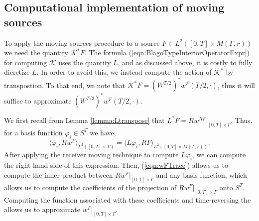 \documentclass[final,leqno]{siamart1116}
\begin{document}
\subsection{Computational implementation of moving sources}
\label{sec:MovingSrcsModification}

To apply the moving sources procedure to a source $F \in L^2([0,T]
\times M(\Gamma,r))$ we need the quantity ${\mathcal{K}}^* F$. The formula
(\ref{eqn:BlagoTypeInteriorOperatorExpr}) for computing ${\mathcal{K}}$ uses
the quantity $L$, and as discussed above, it is costly to fully
dicretize $L$. In order to avoid this, we instead compute the action
of ${\mathcal{K}}^*$ by transpostion. To that end, we note that ${\mathcal{K}}^* F
= (W^{T/2})^*w^F(T/2,\cdot)$, thus it will suffice to approximate
$(W^{T/2})^*w^F(T/2,\cdot)$.

We first recall from Lemma \ref{lemma:Ltranspose} that $L^* F =
Rw^{RF}|_{[0,T] \times \Gamma}$. Thus, for a basis function $\varphi_i
\in S^T$ we have,
\begin{equation}
  \label{eqn:wFTrace}
  \langle \varphi_i, Rw^F \rangle_{L^2([0,T] \times \Gamma)} = \langle
  L\varphi_i, RF \rangle_{L^2([0,T]\times M(\Gamma,r))}.
\end{equation}
After applying the receiver moving technique to compute $L\varphi_i$,
we can compute the right hand side of this expression. Then,
(\ref{eqn:wFTrace}) allows us to compute the inner-product between
$Rw^F|_{[0,T]\times \Gamma}$ and any basis function, which allows us
to compute the coefficients of the projection of
$Rw^F|_{[0,T]\times\Gamma}$ onto $S^T$. Computing the function
associated with these coefficients and time-reversing the allows us to
approximate $w^F|_{[0,T]\times\Gamma}$.
\end{document}
